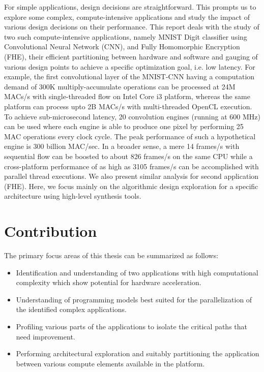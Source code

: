 For simple applications, design decisions are straightforward. This prompts us to explore some complex, compute-intensive applications and study the impact of various design decisions on their performance. 
This report deals with the study of two such compute-intensive applications, namely MNIST Digit classifier using Convolutional Neural Network (CNN), and Fully Homomorphic Encryption (FHE), their efficient partitioning between hardware and software and gauging of various design points to achieve a specific optimization goal, i.e. low latency. For example, the first convolutional layer of the MNIST-CNN having a computation demand of 300K multiply-accumulate operations can be processed at 24M MACs/s with single-threaded flow on Intel Core i3 platform, whereas the same platform can process upto 2B MACs/s with multi-threaded OpenCL execution. To achieve sub-microsecond latency, 20 convolution engines (running at 600 MHz) can be used where each engine is able to produce one pixel by performing 25 MAC operations every clock cycle. The peak performance of such a hypothetical engine is 300 billion MAC/sec. In a broader sense, a mere 14 frames/s with sequential flow can be boosted to about 826 frames/s on the same CPU while a cross-platform performance of as high as 3105 frames/s can be accomplished with parallel thread executions. We also present similar analysis for second application (FHE). Here, we focus mainly on the algorithmic design exploration for a specific architecture using high-level synthesis tools.


\section{Contribution}
\label{sect1_2}
The primary focus areas of this thesis can be summarized as follows:
\begin{itemize}
\item Identification and understanding of two applications with high computational complexity which show potential for hardware acceleration.
\item Understanding of programming models best suited for the parallelization of the identified complex applications.
\item Profiling various parts of the applications to isolate the critical paths that need improvement.
\item Performing architectural exploration and suitably partitioning the application between various compute elements available in the platform.
\end{itemize}

